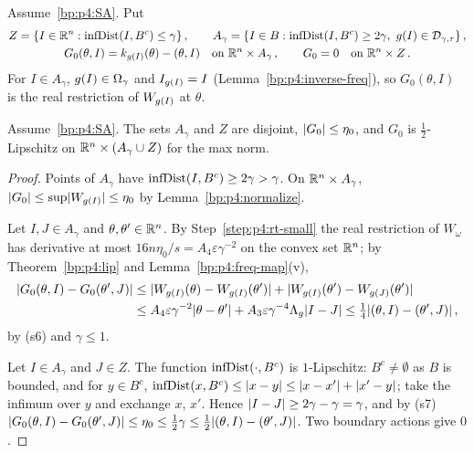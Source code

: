 \begin{definition}\label{bp:p4:good-actions}
Assume~\eqref{bp:p4:SA}. Put
\begin{gather*}
Z=\{I\in\R^n:\infd(I,B^c)\le\gamma\}\,,\qquad
A_\gamma=\{I\in B:\infd(I,B^c)\ge2\gamma,\ \pfg(I)\in\Dio_{\gamma,\tau}\}\,,\\
G_0(\theta,I)=k_{\pfg(I)}(\theta)-(\theta,I)\quad\text{on }\R^n\times A_\gamma\,,\qquad G_0=0\quad\text{on }\R^n\times Z\,.
\end{gather*}
For $I\in A_\gamma$, $g(I)\in\Omega_\gamma$ and $I_{g(I)}=I$ (Lemma~\ref{bp:p4:inverse-freq}),
so $G_0(\theta,I)$ is the real restriction of $W_{g(I)}$ at $\theta$.
\end{definition}

\begin{lemma}\label{bp:p4:map-lipschitz}
Assume~\eqref{bp:p4:SA}. The sets $A_\gamma$ and $Z$ are disjoint, $\lvert G_0\rvert\le\eta_0$, and
$G_0$ is $\frac12$-Lipschitz on $\mathbb{R}^n\times(A_\gamma\cup Z)$ for the max norm.
\end{lemma}

\begin{proof}
\label{step:p4:ml-size}
Points of $A_\gamma$ have $\operatorname{infDist}(I,B^c)\ge2\gamma>\gamma$. On $\mathbb{R}^n\times A_\gamma$,
$\lvert G_0\rvert\le\sup\lvert W_{g(I)}\rvert\le\eta_0$ by Lemma~\ref{bp:p4:normalize}.

\label{step:p4:ml-good}
Let $I,J\in A_\gamma$ and $\theta,\theta'\in\mathbb{R}^n$. By Step~\ref{step:p4:rt-small} the real
restriction of $W_\omega$ has derivative at most $16n\eta_0/s=A_4\varepsilon\gamma^{-2}$ on the
convex set $\mathbb{R}^n$; by Theorem~\ref{bp:p4:lip} and Lemma~\ref{bp:p4:freq-map}(v),
\begin{align*}
\lvert G_0(\theta,I)-G_0(\theta',J)\rvert&\le\lvert W_{g(I)}(\theta)-W_{g(I)}(\theta')\rvert+\lvert W_{g(I)}(\theta')-W_{g(J)}(\theta')\rvert\\
&\le A_4\varepsilon\gamma^{-2}\lvert \theta-\theta'\rvert+A_3\varepsilon\gamma^{-4}\Lambda_g\lvert I-J\rvert\le\tfrac14\lvert (\theta,I)-(\theta',J)\rvert\,,
\end{align*}
by (s6) and $\gamma\le1$.

\label{step:p4:ml-mixed}
Let $I\in A_\gamma$ and $J\in Z$. The function $\operatorname{infDist}(\cdot,B^c)$ is $1$-Lipschitz: $B^c\ne\emptyset$ as $B$ is
bounded, and for $y\in B^c$, $\operatorname{infDist}(x,B^c)\le\lvert x-y\rvert\le\lvert x-x'\rvert+\lvert x'-y\rvert$; take the infimum over $y$
and exchange $x$, $x'$. Hence
$\lvert I-J\rvert\ge2\gamma-\gamma=\gamma$, and by (s7)
$\lvert G_0(\theta,I)-G_0(\theta',J)\rvert\le\eta_0\le\frac12\gamma\le\frac12\lvert (\theta,I)-(\theta',J)\rvert$. Two
boundary actions give $0$.
\end{proof}

